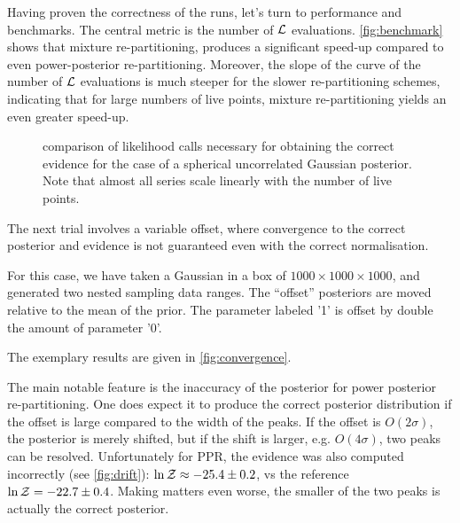 \documentclass[usenatbib]{mnras}
\begin{document}
Having proven the correctness of the runs, let's turn to performance
and benchmarks. The central metric is the number of \({\cal L}\)
evaluations. \autoref{fig:benchmark} shows that mixture
re-partitioning, produces a significant speed-up compared to even
power-posterior re-partitioning. Moreover, the slope of the curve of
the number of \({\cal L}\) evaluations is much steeper for the slower
re-partitioning schemes, indicating that for large numbers of live
points, mixture re-partitioning yields an even greater speed-up.



\begin{figure}
  
\caption{\label{org03c5316}
comparison of likelihood calls necessary for obtaining the correct evidence for the case of a spherical uncorrelated Gaussian posterior. Note that almost all series scale linearly with the number of live points.}
\end{figure}




The next trial involves a variable offset, where convergence to the
correct posterior and evidence is not guaranteed even with the
correct normalisation.    

For this case, we have taken a Gaussian in a box of
\(1000\times1000\times1000\), and generated two nested sampling data
ranges. The ``offset'' posteriors are moved relative to the mean of
the prior. The parameter labeled '1' is offset by double the amount
of parameter '0'. 

The exemplary results are given in \autoref{fig:convergence}.

The main notable feature is the inaccuracy of the posterior for
power posterior re-partitioning. One does expect it to produce the
correct posterior distribution if the offset is large compared to
the width of the peaks. If the offset is \(O(2\sigma)\), the
posterior is merely shifted, but if the shift is larger,
e.g. \(O(4\sigma)\), two peaks can be resolved. Unfortunately for
PPR, the evidence was also computed incorrectly (see
\autoref{fig:drift}): \(\ln {\cal Z}\approx -25.4 \pm 0.2\), vs the
reference \(\ln {\cal Z} = -22.7 \pm 0.4\).  Making matters even
worse, the smaller of the two peaks is actually the correct
posterior.
\end{document}
